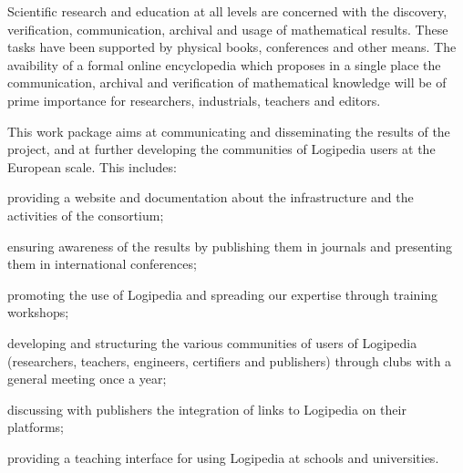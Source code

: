 \begin{workpackage}[id=dissemination,type=MGT,
  short={Dissemination},
  title={Dissemination, communication and exploitation},
  lead=Inr,InrRM=12,BirRM=4,IrtRM=4,ImtRM=2,StrRM=2,ZibRM=14,EduRM=12]

  \begin{wpobjectives}
    Scientific research and education at all levels are concerned with
    the discovery, verification, communication, archival and usage of
    mathematical results. These tasks have been supported by physical
    books, conferences and other means. The avaibility of a formal
    online encyclopedia which proposes in a single place the
    communication, archival and verification of mathematical knowledge
    will be of prime importance for researchers, industrials, teachers
    and editors.

    This work package aims at communicating and disseminating the
    results of the project, and at further developing the communities
    of Logipedia users at the European scale. This includes:
    \begin{compactitem}
    \item providing a website and documentation about the
      infrastructure and the activities of the consortium;
    \item ensuring awareness of the results by publishing them in
      journals and presenting them in international conferences;
    \item promoting the use of Logipedia and spreading our expertise
      through training workshops;
    \item developing and structuring the various communities of users
      of Logipedia (researchers, teachers, engineers, certifiers and
      publishers) through clubs with a general meeting once a year;
    \item discussing with publishers the integration of links to
      Logipedia on their platforms;
    \item providing a teaching interface for using Logipedia at
      schools and universities.
    \end{compactitem}
    \end{wpobjectives}



\end{workpackage}
